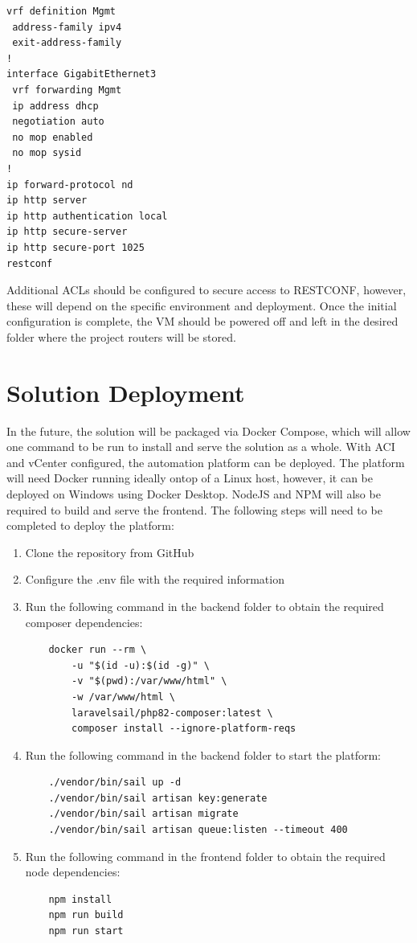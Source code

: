 \begin{verbatim}
vrf definition Mgmt
 address-family ipv4
 exit-address-family
!
interface GigabitEthernet3
 vrf forwarding Mgmt
 ip address dhcp
 negotiation auto
 no mop enabled
 no mop sysid
!
ip forward-protocol nd
ip http server
ip http authentication local
ip http secure-server
ip http secure-port 1025
restconf
\end{verbatim}

Additional ACLs should be configured to secure access to RESTCONF, however, these will depend on the specific environment and deployment. Once the initial configuration is complete, the VM should be powered off and left in the desired folder where the project routers will be stored.


\section*{Solution Deployment}
In the future, the solution will be packaged via Docker Compose, which will allow one command to be run to install and serve the solution as a whole.
With ACI and vCenter configured, the automation platform can be deployed. The platform will need Docker running ideally ontop of a Linux host, however, it can be deployed on Windows using Docker Desktop. NodeJS and NPM will also be required to build and serve the frontend. The following steps will need to be completed to deploy the platform:

\begin{enumerate}
    \item Clone the repository from GitHub
    \item Configure the .env file with the required information
    \item Run the following command in the backend folder to obtain the required composer dependencies:
          \begin{verbatim}
    docker run --rm \
        -u "$(id -u):$(id -g)" \
        -v "$(pwd):/var/www/html" \
        -w /var/www/html \
        laravelsail/php82-composer:latest \
        composer install --ignore-platform-reqs
          \end{verbatim}
    \item Run the following command in the backend folder to start the platform:
          \begin{verbatim}
    ./vendor/bin/sail up -d
    ./vendor/bin/sail artisan key:generate
    ./vendor/bin/sail artisan migrate
    ./vendor/bin/sail artisan queue:listen --timeout 400
            \end{verbatim}
    \item Run the following command in the frontend folder to obtain the required node dependencies:
    \begin{verbatim}
    npm install
    npm run build
    npm run start
    \end{verbatim}
\end{enumerate}

